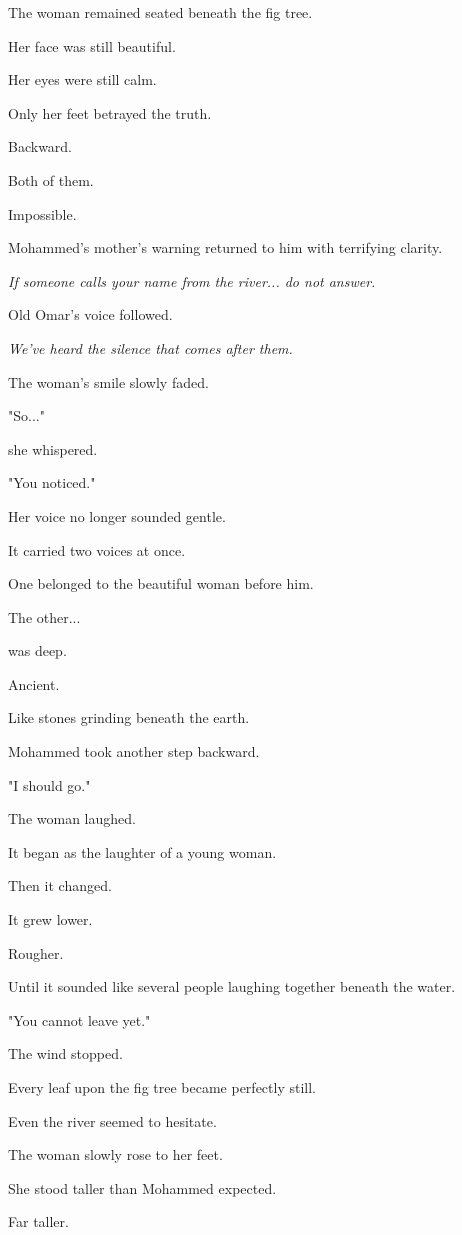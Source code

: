 \documentclass[12pt,openany]{book}
\begin{document}
The woman remained seated beneath the fig tree.

Her face was still beautiful.

Her eyes were still calm.

Only her feet betrayed the truth.

Backward.

Both of them.

Impossible.

Mohammed's mother's warning returned to him with terrifying clarity.

\emph{If someone calls your name from the river... do not answer.}

Old Omar's voice followed.

\emph{We've heard the silence that comes after them.}

The woman's smile slowly faded.

"So..."

she whispered.

"You noticed."

Her voice no longer sounded gentle.

It carried two voices at once.

One belonged to the beautiful woman before him.

The other...

was deep.

Ancient.

Like stones grinding beneath the earth.

Mohammed took another step backward.

"I should go."

The woman laughed.

It began as the laughter of a young woman.

Then it changed.

It grew lower.

Rougher.

Until it sounded like several people laughing together beneath the water.

"You cannot leave yet."

The wind stopped.

Every leaf upon the fig tree became perfectly still.

Even the river seemed to hesitate.

The woman slowly rose to her feet.

She stood taller than Mohammed expected.

Far taller.
\end{document}
